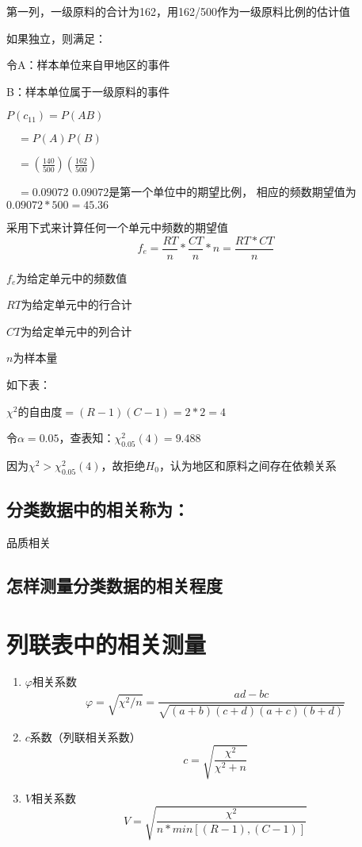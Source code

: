 \documentclass[UTF8,10pt]{book}
\begin{document}
{第一列，一级原料的合计为162，用162/500作为一级原料比例的估计值 

如果独立，则满足： 

令A：样本单位来自甲地区的事件 

B：样本单位属于一级原料的事件 

$P(c_{11}) = P(AB)$ 

$\quad = P(A)P(B)$ 

$\quad = (\frac{140}{500})( \frac{162}{500})$ 

$\quad = 0.09072$ $ 0.09072$是第一个单位中的期望比例，
相应的频数期望值为$0.09072*500 = 45.36$ 

采用下式来计算任何一个单元中频数的期望值 
$$f_e= \frac{RT}{n}*\frac{CT}{n} * n = \frac{RT*CT}{n}$$ 

$f_e$为给定单元中的频数值 

$RT$为给定单元中的行合计 

$CT$为给定单元中的列合计 

$n$为样本量 

如下表： 

$\chi^2$的自由度$=(R-1)(C-1)=2*2=4$ 

令$\alpha=0.05$，查表知：$\chi^2_{0.05}(4)=9.488$ 

因为$\chi^2>\chi^2_{0.05}(4)$，故拒绝$H_0$，认为地区和原料之间存在依赖关系	

\subsection{分类数据中的相关称为：}	品质相关	

\subsection{怎样测量分类数据的相关程度}	

\section{列联表中的相关测量}

\begin{enumerate}
	\item $\varphi $相关系数 
	$$\varphi = \sqrt{\chi^2/n} = \frac{ad-bc}{\sqrt{(a+b)(c+d)(a+c)(b+d)}}$$ 
	\item $c$系数（列联相关系数） 
	$$c = \sqrt{ \frac{\chi^2}{\chi^2 + n}} $$ 
	\item $V$相关系数 
	$$V = \sqrt{\frac{\chi^2}{n*min[(R-1),(C-1)]}}$$

\end{enumerate} 

}
\end{document}
